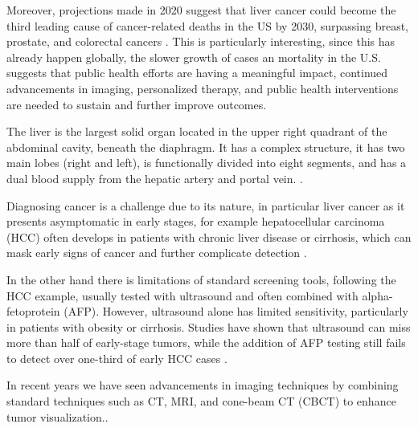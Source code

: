 \documentclass[11pt]{article} %
\begin{document}
\begin{multicols}{2}
Moreover, projections made in 2020 suggest that liver cancer could become the third leading cause of cancer-related deaths in the US by 2030, surpassing breast, prostate, and colorectal cancers \cite{aacr_2030}. This is particularly interesting, since this has already happen globally, the slower growth of cases an mortality in the U.S. suggests that public health efforts are having a meaningful impact, continued advancements in imaging, personalized therapy, and public health interventions are needed to sustain and further improve outcomes.

The liver is the largest solid organ located in the upper right quadrant of the abdominal cavity, beneath the diaphragm. It has a complex structure,  it has two main lobes (right and left), is functionally divided into eight segments, and has a dual blood supply from the hepatic artery and portal vein. \cite{ozmen2020}. %

Diagnosing cancer is a challenge due to its nature, in particular liver cancer as it presents asymptomatic in early stages, for example hepatocellular carcinoma (HCC) often develops in patients with chronic liver disease or cirrhosis, which can mask early signs of cancer and further complicate detection \cite{quaglia2018}.

In the other hand there is limitations of standard screening tools, following the HCC example, usually tested with ultrasound and often combined with alpha-fetoprotein (AFP). %
However, ultrasound alone has limited sensitivity, particularly in patients with obesity or cirrhosis.\cite{floridi2022} Studies have shown that ultrasound can miss more than half of early-stage tumors, while the addition of AFP testing still fails to detect over one-third of early HCC cases \cite{mcmahon2023}.


In recent years we have seen advancements in imaging techniques by combining standard techniques such as CT, MRI, and cone-beam CT (CBCT) to enhance tumor visualization.\cite{floridi2022}.


\end{multicols}
\end{document}

